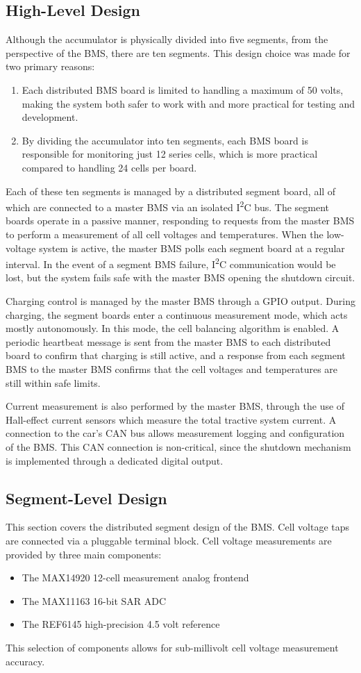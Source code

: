 \documentclass[12pt]{article}
\newcommand{\iic}{I\textsuperscript{2}C}
\begin{document}
\subsection{High-Level Design}
Although the accumulator is physically divided into five segments, from the perspective of the BMS, there are ten segments.
This design choice was made for two primary reasons:
\begin{enumerate}[label=(\arabic*)]
\item Each distributed BMS board is limited to handling a maximum of 50 volts, making the system both safer to work with and more practical for testing and development.
\item By dividing the accumulator into ten segments, each BMS board is responsible for monitoring just 12 series cells, which is more practical compared to handling 24 cells per board.
\end{enumerate}

Each of these ten segments is managed by a distributed segment board, all of which are connected to a master BMS via an isolated \iic{} bus.
The segment boards operate in a passive manner, responding to requests from the master BMS to perform a measurement of all cell voltages and temperatures.
When the low-voltage system is active, the master BMS polls each segment board at a regular interval.
In the event of a segment BMS failure, \iic{} communication would be lost, but the system fails safe with the master BMS opening the shutdown circuit.

Charging control is managed by the master BMS through a GPIO output.
During charging, the segment boards enter a continuous measurement mode, which acts mostly autonomously.
In this mode, the cell balancing algorithm is enabled.
A periodic heartbeat message is sent from the master BMS to each distributed board to confirm that charging is still active, and a response from each segment BMS to the master BMS confirms that the cell voltages and temperatures are still within safe limits.

Current measurement is also performed by the master BMS, through the use of Hall-effect current sensors which measure the total tractive system current.
A connection to the car's CAN bus allows measurement logging and configuration of the BMS.
This CAN connection is non-critical, since the shutdown mechanism is implemented through a dedicated digital output.

\subsection{Segment-Level Design}
This section covers the distributed segment design of the BMS.
Cell voltage taps are connected via a pluggable terminal block.
Cell voltage measurements are provided by three main components:
\begin{itemize}
\item The MAX14920 12-cell measurement analog frontend
\item The MAX11163 16-bit SAR ADC
\item The REF6145 high-precision 4.5 volt reference
\end{itemize}
This selection of components allows for sub-millivolt cell voltage measurement accuracy.
\end{document}

